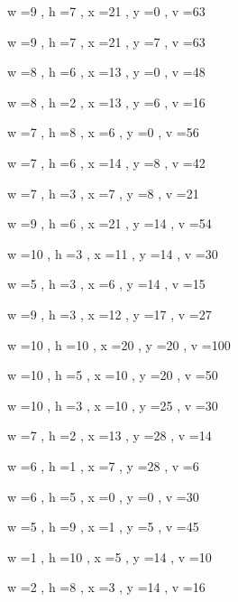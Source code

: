 \documentclass[11pt]{article}
\begin{document}
w =9 , h =7 , x =21 , y =0 , v =63
\par
w =9 , h =7 , x =21 , y =7 , v =63
\par
w =8 , h =6 , x =13 , y =0 , v =48
\par
w =8 , h =2 , x =13 , y =6 , v =16
\par
w =7 , h =8 , x =6 , y =0 , v =56
\par
w =7 , h =6 , x =14 , y =8 , v =42
\par
w =7 , h =3 , x =7 , y =8 , v =21
\par
w =9 , h =6 , x =21 , y =14 , v =54
\par
w =10 , h =3 , x =11 , y =14 , v =30
\par
w =5 , h =3 , x =6 , y =14 , v =15
\par
w =9 , h =3 , x =12 , y =17 , v =27
\par
w =10 , h =10 , x =20 , y =20 , v =100
\par
w =10 , h =5 , x =10 , y =20 , v =50
\par
w =10 , h =3 , x =10 , y =25 , v =30
\par
w =7 , h =2 , x =13 , y =28 , v =14
\par
w =6 , h =1 , x =7 , y =28 , v =6
\par
w =6 , h =5 , x =0 , y =0 , v =30
\par
w =5 , h =9 , x =1 , y =5 , v =45
\par
w =1 , h =10 , x =5 , y =14 , v =10
\par
w =2 , h =8 , x =3 , y =14 , v =16
\par
\newpage
\end{document}

